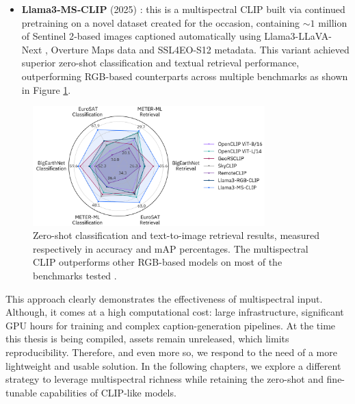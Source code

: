 \documentclass[a4paper, oneside, english]{sapthesis} %
\begin{document}
\begin{itemize}
    \item \textbf{Llama3‑MS‑CLIP} (2025) \cite{marimo2025beyond}: this is a multispectral CLIP built via continued pretraining on a novel dataset created for the occasion, containing $\sim 1$ million of Sentinel 2‑based images captioned automatically using Llama3-LLaVA-Next \cite{li2024llava}, Overture Maps data and SSL4EO-S12 \cite{wang2023ssl4eo} metadata. This variant achieved superior zero-shot classification and textual retrieval performance, outperforming RGB-based counterparts across multiple benchmarks as shown in Figure \ref{fig:msclip}.
\end{itemize}

\begin{figure}[h]
    \centering
    \includegraphics[width=0.8\textwidth]{img/MS-CLIP.png}
    \caption{Zero-shot classification and text-to-image retrieval results, measured respectively in accuracy and mAP percentages. The multispectral CLIP outperforms other RGB-based models on most of the benchmarks tested \cite{marimo2025beyond}.}
    \label{fig:msclip}
\end{figure}

This approach clearly demonstrates the effectiveness of multispectral input. Although, it comes at a high computational cost: large infrastructure, significant GPU hours for training and complex caption-generation pipelines. At the time this thesis is being compiled, assets remain unreleased, which limits reproducibility. Therefore, and even more so, we respond to the need of a more lightweight and usable solution. In the following chapters, we explore a different strategy to leverage multispectral richness while retaining the zero-shot and fine-tunable capabilities of CLIP-like models.


\end{document}
